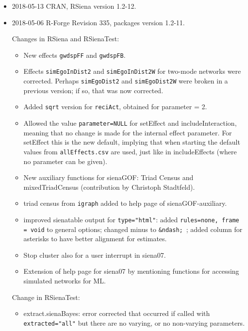 \documentclass[a4paper,fleqn,11pt]{article}
\newcommand{\+}{\, + \,}
\begin{document}
\begin{small}
\begin{itemize}
\item 2018-05-13 CRAN, RSiena version 1.2-12.

\item 2018-05-06 R-Forge Revision 335, packages version 1.2-11.

Changes in RSiena and RSienaTest:
\begin{itemize}
   \item New effects \texttt{gwdspFF} and \texttt{gwdspFB}.
   \item Effects \texttt{simEgoInDist2} and \texttt{simEgoInDist2W}
   for two-mode networks were corrected.
     Perhaps \texttt{simEgoDist2} and \texttt{simEgoDist2W} were broken
     in a previous version; if so, that was now corrected.
   \item Added \texttt{sqrt} version for \texttt{reciAct}, obtained for parameter = 2.
   \item Allowed the value \texttt{parameter=NULL} for \textsf{setEffect} and
   \textsf{includeInteraction},
     meaning that no change is made for the internal effect parameter.
     For \textsf{setEffect} this is the new default,
     implying that when starting the
     default values from \texttt{allEffects.csv} are used, just like in
     \textsf{includeEffects}
     (where no parameter can be given).
   \item New auxiliary functions for \textsf{sienaGOF}:
   \textsf{Triad Census} and \textsf{mixedTriadCensus}
     (contribution by Christoph Stadtfeld).
   \item triad census from \texttt{igraph} added to help page of
   \textsf{sienaGOF-auxiliary}.
   \item improved \textsf{sienatable} output for \texttt{type="html"}:
   added \texttt{rules=none, frame = void} to
     general options; changed minus to \texttt{\&ndash;}~;
     added column for asterisks to have better alignment for estimates.
   \item Stop cluster also for a user interrupt in  \textsf{siena07}.
   \item Extension of help page for \textsf{siena07} by
   mentioning functions for accessing simulated networks for ML.
\end{itemize}

Change in RSienaTest:
\begin{itemize}
   \item \textsf{extract.sienaBayes}:
   error corrected that occurred if called with
     \texttt{extracted="all"} but there are no varying,
     or no non-varying parameters.
\end{itemize}


\end{itemize}
\end{small}
\end{document}
